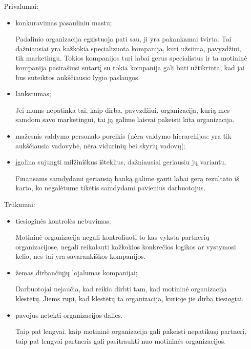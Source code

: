 Privalumai:
\begin{itemize}
  \item konkuravimas pasauliniu mastu;
    \begin{note}
      Padalinio organizacija egzistuoja pati sau, ji yra pakankamai
      tvirta. Tai dažniausiai yra kažkokia specializuota kompanija,
      kuri užsiima, pavyzdžiui, tik marketingu. Tokios kompanijos
      turi labai gerus specialistus ir ta motininė kompanija pasirašiusi
      sutartį su tokia kompanija gali būti užtikrinta, kad jai bus
      suteiktos aukščiausio lygio paslaugos.
    \end{note}
  \item lankstumas;
    \begin{note}
      Jei mums nepatinka tai, kaip dirba, pavyzdžiui, organizacija, kurią
      mes samdom savo marketingui, tai ją galime laisvai pakeisti
      kita organizacija.
    \end{note}
  \item mažesnis valdymo personalo poreikis (nėra valdymo hierarchijos:
    yra tik aukščiausia vadovybė, nėra vidurinių bei skyrių vadovų);
  \item įgalina sujungti milžiniškus išteklius, dažniausiai geriausiu jų
    variantu.
    \begin{exmp}
      Finansams samdydami geriausią banką galime gauti labai gerą
      rezultato iš karto, ko negalėtume tikėtis samdydami pavienius
      darbuotojus.
    \end{exmp}
\end{itemize}

Trūkumai:
\begin{itemize}
  \item tiesioginės kontrolės nebuvimas;
    \begin{note}
      Motininė organizacija negali kontroliuoti to kas vyksta partnerių
      organizacijose, negali reikalauti kažkokios konkrečios logikos
      ar vystymosi kelio, nes tai yra savarankiškos kompanijos.
    \end{note}
  \item žemas dirbančiųjų lojalumas kompanijai;
    \begin{note}
      Darbuotojai nejaučia, kad reikia dirbti tam, kad motininė
      organizacija klestėtų. Jiems rūpi, kad klestėtų ta organizacija,
      kurioje jie dirba tiesiogiai.
    \end{note}
  \item pavojus netekti organizacijos dalies.
    \begin{note}
      Taip pat lengvai, kaip motininė organizacija gali pakeisti
      nepatikusį partnerį, taip pat lengvai partneris gali pasitraukti
      nuo motininės organizacijos.
    \end{note}
\end{itemize}


